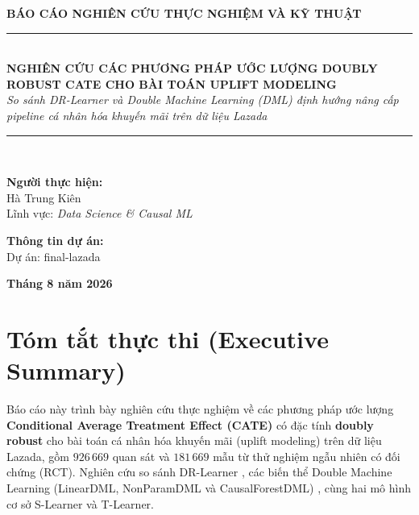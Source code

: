 \documentclass[11pt,a4paper]{article}
\DeclareRobustCommand{\code}[1]{{\small\texttt{#1}}}
\def\code#1{#1}%
\begin{document}
\begin{titlepage}
    \centering
    \vspace*{1cm}
    {\Large \bfseries BÁO CÁO NGHIÊN CỨU THỰC NGHIỆM VÀ KỸ THUẬT}\\[1.5cm]

    \rule{\textwidth}{1.5pt}\\[0.4cm]
    {\huge \bfseries NGHIÊN CỨU CÁC PHƯƠNG PHÁP ƯỚC LƯỢNG DOUBLY ROBUST CATE CHO BÀI TOÁN UPLIFT MODELING}\\[0.3cm]
    {\large \itshape So sánh DR-Learner và Double Machine Learning (DML) định hướng nâng cấp pipeline cá nhân hóa khuyến mãi trên dữ liệu Lazada}\\[0.2cm]
    \rule{\textwidth}{1.5pt}\\[2cm]

    \begin{minipage}{0.45\textwidth}
        \begin{flushleft} \large
            \textbf{Người thực hiện:}\\
            Hà Trung Kiên\\
            Lĩnh vực: \textit{Data Science \& Causal ML}
        \end{flushleft}
    \end{minipage}
    \begin{minipage}{0.45\textwidth}
        \begin{flushright} \large
            \textbf{Thông tin dự án:}\\
            Dự án: \code{final-lazada}
        \end{flushright}
    \end{minipage}

    \vfill
    {\large \textbf{Tháng 8 năm 2026}}
\end{titlepage}

\newpage
\tableofcontents
\newpage
\listoffigures
\newpage
\listoftables
\newpage

\section*{Tóm tắt thực thi (Executive Summary)}

Báo cáo này trình bày nghiên cứu thực nghiệm về các phương pháp ước lượng
\textbf{Conditional Average Treatment Effect (CATE)} có đặc tính
\textbf{doubly robust} cho bài toán cá nhân hóa khuyến mãi (uplift modeling)
trên dữ liệu Lazada, gồm $926\,669$ quan sát và $181\,669$ mẫu từ thử nghiệm
ngẫu nhiên có đối chứng (RCT). Nghiên cứu so sánh DR-Learner
\cite{kennedy2020}, các biến thể Double Machine Learning (LinearDML,
NonParamDML và CausalForestDML) \cite{chernozhukov2018}, cùng hai mô hình cơ
sở S-Learner và T-Learner.
\end{document}
